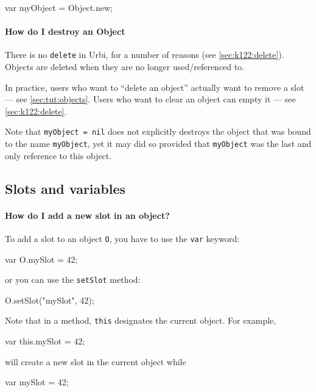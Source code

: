 \begin{urbifixme}
var myObject = Object.new;
\end{urbifixme}

\paragraph{How do I destroy an Object}
There is no \lstinline{delete} in Urbi, for a number of reasons (see
\autoref{sec:k122:delete}).  Objects are deleted when they are no
longer used/referenced to.

In practice, users who want to ``delete an object'' actually want to
remove a slot --- see \autoref{sec:tut:objects}.  Users who want to
clear an object can empty it --- see \autoref{sec:k122:delete}.

Note that \lstinline{myObject = nil} does not explicitly destroys the
object that was bound to the name \lstinline{myObject}, yet it may did
so provided that \lstinline{myObject} was the last and only reference
to this object.

\subsection{Slots and variables}

\paragraph{How do I add a new slot in an object?}
To add a slot to an object \lstinline{O}, you have to use the
\lstinline{var} keyword:

\begin{urbifixme}
var O.mySlot = 42;
\end{urbifixme}

\noindent
or you can use the \lstinline{setSlot} method:

\begin{urbifixme}
O.setSlot("mySlot", 42);
\end{urbifixme}

Note that in a method, \lstinline{this} designates the current
object. For example,

\begin{urbifixme}
var this.mySlot = 42;
\end{urbifixme}

\noindent
will create a new slot in the current object while

\begin{urbifixme}
var mySlot = 42;
\end{urbifixme}

